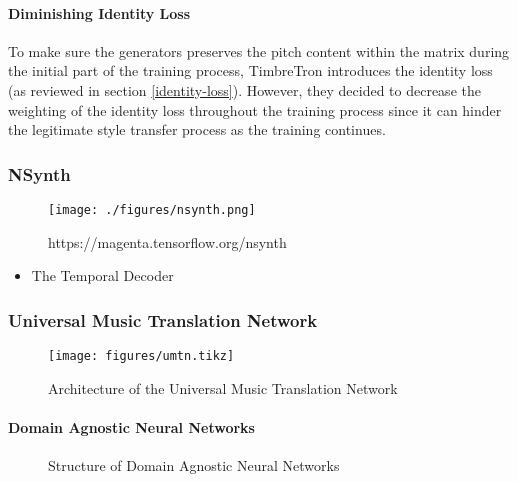 \documentclass[]{article}
\providecommand{\tightlist}{%
  \setlength{\itemsep}{0pt}\setlength{\parskip}{0pt}}
\begin{document}
\paragraph{Diminishing Identity Loss}

To make sure the generators preserves the pitch content within the
matrix during the initial part of the training process, TimbreTron
introduces the identity loss (as reviewed in section
\ref{identity-loss}). However, they decided to decrease the weighting of
the identity loss throughout the training process since it can hinder
the legitimate style transfer process as the training continues.

\hypertarget{nsynth}{%
\subsubsection{NSynth}\label{nsynth}}

\begin{figure}
\centering
\texttt{[image: ./figures/nsynth.png]}
\caption{https://magenta.tensorflow.org/nsynth}
\end{figure}

\begin{itemize}
\tightlist
\item
  The Temporal Decoder
\end{itemize}

\hypertarget{universal-music-translation-network}{%
\subsubsection{Universal Music Translation
Network}\label{universal-music-translation-network}}

\begin{figure}[h]
    \texttt{[image: figures/umtn.tikz]}
\centering 
\caption{Architecture of the Universal Music Translation Network \label{fig:facebook}}
\end{figure}

\hypertarget{domain-agnostic-neural-networks}{%
\paragraph{Domain Agnostic Neural
Networks}\label{domain-agnostic-neural-networks}}

\begin{figure}[h]
    \def\svgwidth{\textwidth}
    
    \centering
    \caption{Structure of Domain Agnostic Neural Networks \label{fig:dann}}
\end{figure}
\end{document}

